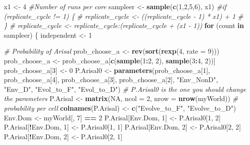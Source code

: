 \documentclass[]{book}
\newenvironment{Shaded}{\begin{snugshade}}{\end{snugshade}}
\newcommand{\KeywordTok}[1]{\textcolor[rgb]{0.13,0.29,0.53}{\textbf{{#1}}}}
\newcommand{\DataTypeTok}[1]{\textcolor[rgb]{0.13,0.29,0.53}{{#1}}}
\newcommand{\DecValTok}[1]{\textcolor[rgb]{0.00,0.00,0.81}{{#1}}}
\newcommand{\StringTok}[1]{\textcolor[rgb]{0.31,0.60,0.02}{{#1}}}
\newcommand{\CommentTok}[1]{\textcolor[rgb]{0.56,0.35,0.01}{\textit{{#1}}}}
\newcommand{\OtherTok}[1]{\textcolor[rgb]{0.56,0.35,0.01}{{#1}}}
\newcommand{\ControlFlowTok}[1]{\textcolor[rgb]{0.13,0.29,0.53}{\textbf{{#1}}}}
\newcommand{\OperatorTok}[1]{\textcolor[rgb]{0.81,0.36,0.00}{\textbf{{#1}}}}
\newcommand{\NormalTok}[1]{{#1}}
\theoremstyle{definition}
\theoremstyle{definition}
\theoremstyle{definition}
\theoremstyle{remark}
\begin{document}
\begin{Shaded}
\begin{Highlighting}[]
\NormalTok{  x1 <-}\StringTok{ }\DecValTok{4} \CommentTok{#Number of runs per core}
\NormalTok{  sampleer <-}\StringTok{ }\KeywordTok{sample}\NormalTok{(}\KeywordTok{c}\NormalTok{(}\DecValTok{1}\NormalTok{,}\DecValTok{2}\NormalTok{,}\DecValTok{5}\NormalTok{,}\DecValTok{6}\NormalTok{), x1)}
  \CommentTok{#if (replicate_cycle != 1) \{}
  \CommentTok{#  replicate_cycle <- ((replicate_cycle - 1) * x1) + 1}
 \CommentTok{# \}}
 \CommentTok{# replicate_cycle <- replicate_cycle:(replicate_cycle + (x1 - 1))}
  \ControlFlowTok{for}\NormalTok{ (count }\ControlFlowTok{in}\NormalTok{ sampleer) \{}
\NormalTok{  independent <-}\StringTok{ }\DecValTok{1} 

    
    \CommentTok{# Probability of Arisal}
\NormalTok{    prob_choose_a <-}\StringTok{ }\KeywordTok{rev}\NormalTok{(}\KeywordTok{sort}\NormalTok{(}\KeywordTok{rexp}\NormalTok{(}\DecValTok{4}\NormalTok{, }\DataTypeTok{rate =} \DecValTok{9}\NormalTok{)))}
\NormalTok{    prob_choose_a <-}\StringTok{ }\NormalTok{prob_choose_a[}\KeywordTok{c}\NormalTok{(}\KeywordTok{sample}\NormalTok{(}\DecValTok{1}\OperatorTok{:}\DecValTok{2}\NormalTok{, }\DecValTok{2}\NormalTok{), }\KeywordTok{sample}\NormalTok{(}\DecValTok{3}\OperatorTok{:}\DecValTok{4}\NormalTok{, }\DecValTok{2}\NormalTok{))]}
\NormalTok{    prob_choose_a[}\DecValTok{3}\NormalTok{] <-}\StringTok{ }\DecValTok{0}
\NormalTok{    P.Arisal0  <-}\StringTok{ }\KeywordTok{parameters}\NormalTok{(prob_choose_a[}\DecValTok{1}\NormalTok{], prob_choose_a[}\DecValTok{4}\NormalTok{],}
\NormalTok{                             prob_choose_a[}\DecValTok{3}\NormalTok{], prob_choose_a[}\DecValTok{2}\NormalTok{],}
                             \StringTok{"Env_NonD"}\NormalTok{, }\StringTok{"Env_D"}\NormalTok{,}
                             \StringTok{"Evol_to_F"}\NormalTok{, }\StringTok{"Evol_to_D"}\NormalTok{)}
    \CommentTok{# P.Arisal0 is the one you should change the parameters}
\NormalTok{    P.Arisal <-}\StringTok{ }\KeywordTok{matrix}\NormalTok{(}\OtherTok{NA}\NormalTok{, }\DataTypeTok{ncol =} \DecValTok{2}\NormalTok{, }\DataTypeTok{nrow =} \KeywordTok{nrow}\NormalTok{(myWorld)) }\CommentTok{# probability per cell}
    \KeywordTok{colnames}\NormalTok{(P.Arisal) <-}\StringTok{ }\KeywordTok{c}\NormalTok{(}\StringTok{"Evolve_to_F"}\NormalTok{, }\StringTok{"Evolve_to_D"}\NormalTok{)}
\NormalTok{    Env.Dom <-}\StringTok{ }\NormalTok{myWorld[, }\DecValTok{7}\NormalTok{] }\OperatorTok{==}\StringTok{ }\DecValTok{2}
\NormalTok{    P.Arisal[Env.Dom, }\DecValTok{1}\NormalTok{] <-}\StringTok{ }\NormalTok{P.Arisal0[}\DecValTok{1}\NormalTok{, }\DecValTok{2}\NormalTok{]}
\NormalTok{    P.Arisal[}\OperatorTok{!}\NormalTok{Env.Dom, }\DecValTok{1}\NormalTok{] <-}\StringTok{ }\NormalTok{P.Arisal0[}\DecValTok{1}\NormalTok{, }\DecValTok{1}\NormalTok{]}
\NormalTok{    P.Arisal[Env.Dom, }\DecValTok{2}\NormalTok{] <-}\StringTok{ }\NormalTok{P.Arisal0[}\DecValTok{2}\NormalTok{, }\DecValTok{2}\NormalTok{]}
\NormalTok{    P.Arisal[}\OperatorTok{!}\NormalTok{Env.Dom, }\DecValTok{2}\NormalTok{] <-}\StringTok{ }\NormalTok{P.Arisal0[}\DecValTok{2}\NormalTok{, }\DecValTok{1}\NormalTok{]}
    

\end{Highlighting}
\end{Shaded}
\end{document}
